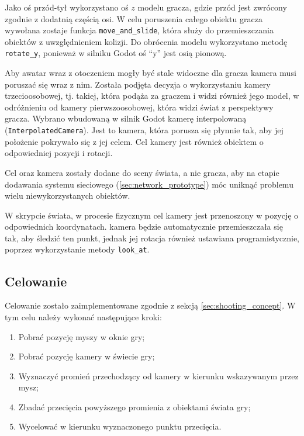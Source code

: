 Jako oś przód-tył wykorzystano oś $z$ modelu gracza, gdzie przód jest zwrócony zgodnie z dodatnią częścią osi. W celu poruszenia całego obiektu gracza wywołana zostaje funkcja \texttt{move\_and\_slide}, która służy do przemieszczania obiektów z uwzględnieniem kolizji. Do obrócenia modelu wykorzystano metodę \texttt{rotate\_y}, ponieważ w silniku Godot oś ``y'' jest osią pionową.

Aby awatar wraz z otoczeniem mogły być stale widoczne dla gracza kamera musi poruszać się wraz z nim. Została podjęta decyzja o wykorzystaniu kamery trzecioosobowej, tj. takiej, która podąża za graczem i widzi również jego model, w odróżnieniu od kamery pierwszoosobowej, która widzi świat z perspektywy gracza. Wybrano wbudowaną w silnik Godot kamerę interpolowaną (\texttt{InterpolatedCamera}). Jest to kamera, która porusza się płynnie tak, aby jej położenie pokrywało się z jej celem. Cel kamery jest również obiektem o odpowiedniej pozycji i rotacji.

Cel oraz kamera zostały dodane do sceny świata, a nie gracza, aby na etapie dodawania systemu sieciowego (\ref{sec:network_prototype}) móc uniknąć problemu wielu niewykorzystanych obiektów. 

W skrypcie świata, w procesie fizycznym cel kamery jest przenoszony w pozycję o odpowiednich koordynatach. kamera będzie automatycznie przemieszczała się tak, aby śledzić ten punkt, jednak jej rotacja również ustawiana programistycznie, poprzez wykorzystanie metody \texttt{look\_at}. 

\subsection{Celowanie}

Celowanie zostało zaimplementowane zgodnie z sekcją \ref{sec:shooting_concept}. W tym celu należy wykonać następujące kroki:
\begin{enumerate}
    \item\label{pt:get_mouse} Pobrać pozycję myszy w oknie gry;
    \item Pobrać pozycję kamery w świecie gry;
    \item Wyznaczyć promień przechodzący od kamery w kierunku wskazywanym przez mysz;
    \item\label{pt:get_ray_intersection} Zbadać przecięcia powyższego promienia z obiektami świata gry;
    \item Wycelować w kierunku wyznaczonego punktu przecięcia.  
\end{enumerate}

